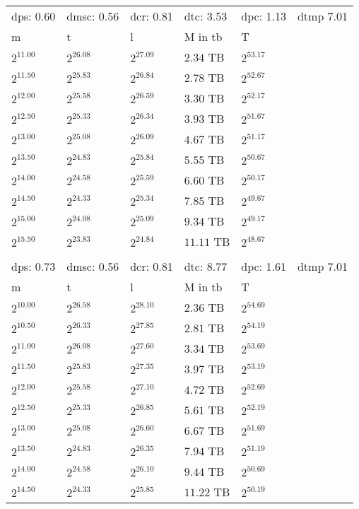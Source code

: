 \begin{tabular}{llllll}
dps: 0.60 & dmsc: 0.56 & dcr: 0.81 & dtc: 3.53 & dpc: 1.13 & dtmp 7.01 \\
m & t & l & M in tb & T \\
$2^{11.00}$ & $2^{26.08}$ & $2^{27.09}$ & $2.34$ TB & $2^{53.17}$ \\
$2^{11.50}$ & $2^{25.83}$ & $2^{26.84}$ & $2.78$ TB & $2^{52.67}$ \\
$2^{12.00}$ & $2^{25.58}$ & $2^{26.59}$ & $3.30$ TB & $2^{52.17}$ \\
$2^{12.50}$ & $2^{25.33}$ & $2^{26.34}$ & $3.93$ TB & $2^{51.67}$ \\
$2^{13.00}$ & $2^{25.08}$ & $2^{26.09}$ & $4.67$ TB & $2^{51.17}$ \\
$2^{13.50}$ & $2^{24.83}$ & $2^{25.84}$ & $5.55$ TB & $2^{50.67}$ \\
$2^{14.00}$ & $2^{24.58}$ & $2^{25.59}$ & $6.60$ TB & $2^{50.17}$ \\
$2^{14.50}$ & $2^{24.33}$ & $2^{25.34}$ & $7.85$ TB & $2^{49.67}$ \\
$2^{15.00}$ & $2^{24.08}$ & $2^{25.09}$ & $9.34$ TB & $2^{49.17}$ \\
$2^{15.50}$ & $2^{23.83}$ & $2^{24.84}$ & $11.11$ TB & $2^{48.67}$ \\
 &  &  &  &  &  \\
dps: 0.73 & dmsc: 0.56 & dcr: 0.81 & dtc: 8.77 & dpc: 1.61 & dtmp 7.01 \\
m & t & l & M in tb & T \\
$2^{10.00}$ & $2^{26.58}$ & $2^{28.10}$ & $2.36$ TB & $2^{54.69}$ \\
$2^{10.50}$ & $2^{26.33}$ & $2^{27.85}$ & $2.81$ TB & $2^{54.19}$ \\
$2^{11.00}$ & $2^{26.08}$ & $2^{27.60}$ & $3.34$ TB & $2^{53.69}$ \\
$2^{11.50}$ & $2^{25.83}$ & $2^{27.35}$ & $3.97$ TB & $2^{53.19}$ \\
$2^{12.00}$ & $2^{25.58}$ & $2^{27.10}$ & $4.72$ TB & $2^{52.69}$ \\
$2^{12.50}$ & $2^{25.33}$ & $2^{26.85}$ & $5.61$ TB & $2^{52.19}$ \\
$2^{13.00}$ & $2^{25.08}$ & $2^{26.60}$ & $6.67$ TB & $2^{51.69}$ \\
$2^{13.50}$ & $2^{24.83}$ & $2^{26.35}$ & $7.94$ TB & $2^{51.19}$ \\
$2^{14.00}$ & $2^{24.58}$ & $2^{26.10}$ & $9.44$ TB & $2^{50.69}$ \\
$2^{14.50}$ & $2^{24.33}$ & $2^{25.85}$ & $11.22$ TB & $2^{50.19}$ \\

\end{tabular}
